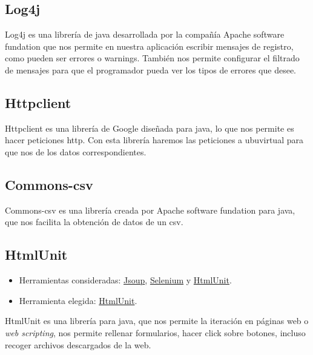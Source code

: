 \subsection{Log4j}\label{log4j}

Log4j es una librería de java desarrollada por la compañía Apache software fundation que nos permite en nuestra aplicación escribir mensajes de registro, como pueden ser errores o warnings. También nos permite configurar el filtrado de mensajes para que el programador pueda ver los tipos de errores que desee. \cite{Java:log}

\subsection{Httpclient}\label{httpclient}

Httpclient es una librería de Google diseñada para java, lo que nos permite es hacer peticiones http. Con esta librería haremos las peticiones a ubuvirtual para que nos de los datos correspondientes. \cite{java:Httpclient}

\subsection{Commons-csv}\label{commons-csv}

Commons-csv es una librería creada por Apache software fundation para java, que nos facilita la obtención de datos de un csv. \cite{java:csvparser}

\subsection{HtmlUnit}\label{htmlunit}
\begin{itemize}
	\tightlist
	\item
	Herramientas consideradas: \href{https://jsoup.org/}{Jsoup},
	\href{http://www.seleniumhq.org/}{Selenium} y
	\href{http://htmlunit.sourceforge.net/}{HtmlUnit}.
	\item
	Herramienta elegida: \href{http://htmlunit.sourceforge.net/}{HtmlUnit}.
\end{itemize}

HtmlUnit es una librería para java, que nos permite la iteración en páginas web o \emph{web scripting}, nos permite rellenar formularios, hacer click sobre botones, incluso recoger archivos descargados de la web. \cite{Java:htmlunit}



